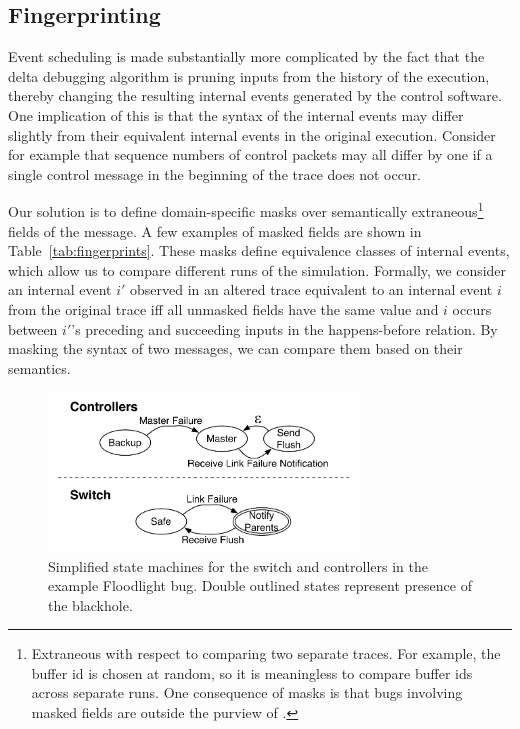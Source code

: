 \subsection{Fingerprinting}
\label{subsec:fingerprinting}

Event scheduling is made substantially more complicated by the fact
that the delta debugging algorithm is pruning inputs from the history of the
execution, thereby changing the resulting internal events generated by the control
software. One implication of this is that the syntax of the internal events may differ
slightly from their equivalent internal events in the original
execution. Consider for example that sequence numbers of control packets may
all differ by one if a single control message in the beginning of the trace
does not occur.

Our solution is to define domain-specific masks over
semantically extraneous\footnote{Extraneous with respect to comparing two
separate traces. For example, the buffer id is chosen at random, so
it is meaningless to compare buffer ids across separate runs. One consequence
of masks is that bugs involving masked fields are outside the purview of
\simulator.} fields of
the message. A few examples of masked fields are shown
in Table~\ref{tab:fingerprints}. These masks define equivalence classes
of internal events, which allow us to compare different runs of the simulation.
Formally, we consider an internal event $i'$ observed in an altered trace
equivalent to an internal event $i$ from the original trace iff all unmasked
fields have the same value
and $i$ occurs between $i'$'s preceding and succeeding inputs in the
happens-before relation. By masking the syntax of two messages, we can compare them
based on their semantics.

\begin{figure}[t]
    \includegraphics[width=3.25in]{../diagrams/state_machines/controller_switch.pdf}
    \caption[]{\label{fig:state_machines} Simplified state machines for the switch and
    controllers in the example Floodlight bug. Double outlined states
    represent presence of the blackhole.}
\end{figure}

